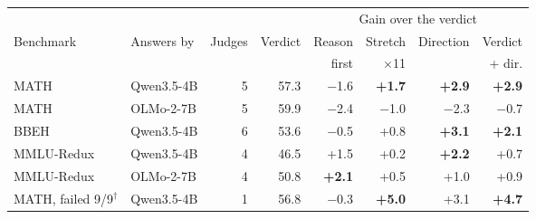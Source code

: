 \begin{tabular}{llr r rrrr}
\toprule
& & & & \multicolumn{4}{c}{Gain over the verdict} \\ \cmidrule(l){5-8}
Benchmark & Answers by & Judges & Verdict & Reason & Stretch & Direction & Verdict \\
& & & & first & $\times$11 & & + dir. \\
\midrule
MATH & Qwen3.5-4B & 5 & 57.3 & $-$1.6 & \textbf{+1.7} & \textbf{+2.9} & \textbf{+2.9} \\
MATH & OLMo-2-7B & 5 & 59.9 & $-$2.4 & $-$1.0 & $-$2.3 & $-$0.7 \\
BBEH & Qwen3.5-4B & 6 & 53.6 & $-$0.5 & +0.8 & \textbf{+3.1} & \textbf{+2.1} \\
MMLU-Redux & Qwen3.5-4B & 4 & 46.5 & +1.5 & +0.2 & \textbf{+2.2} & +0.7 \\
MMLU-Redux & OLMo-2-7B & 4 & 50.8 & \textbf{+2.1} & +0.5 & +1.0 & +0.9 \\
\midrule
MATH, failed 9/9$^\dagger$ & Qwen3.5-4B & 1 & 56.8 & $-$0.3 & \textbf{+5.0} & +3.1 & \textbf{+4.7} \\
\bottomrule
\end{tabular}
